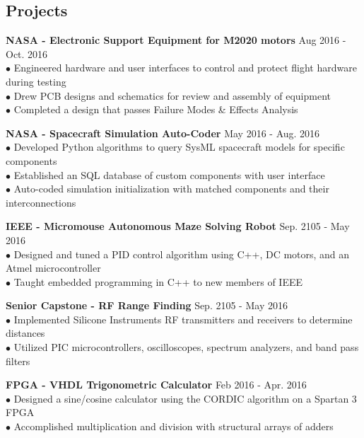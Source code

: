 \documentclass[margin,line]{res}
\begin{document}
\begin{resume}
\section{\sc Projects}
{\bf NASA - Electronic Support Equipment for M2020 motors} \hfill{Aug 2016 - Oct. 2016}\\
$\bullet$ Engineered hardware and user interfaces to control and protect flight hardware during testing \\
$\bullet$ Drew PCB designs and schematics for review and assembly of equipment \\
$\bullet$ Completed a design that passes  Failure Modes \& Effects Analysis

{\bf NASA - Spacecraft Simulation Auto-Coder}
\hfill{May 2016 - Aug. 2016}\\
$\bullet$ Developed Python algorithms to query SysML spacecraft models for specific components \\
$\bullet$ Established an SQL database of custom components with user interface \\
$\bullet$ Auto-coded simulation initialization with matched components and their interconnections 

{\bf IEEE - Micromouse Autonomous Maze Solving Robot}
\hfill{Sep. 2105 - May 2016}\\
$\bullet$ Designed and tuned a PID control algorithm using C++, DC motors, and an Atmel microcontroller \\
$\bullet$ Taught embedded programming in C++ to new members of IEEE


{\bf Senior Capstone - RF Range Finding}
\hfill{Sep. 2105 - May 2016}\\
$\bullet$ Implemented Silicone Instruments RF transmitters and receivers to determine distances \\
$\bullet$ Utilized PIC microcontrollers, oscilloscopes, spectrum analyzers, and band pass filters 


{\bf FPGA - VHDL Trigonometric Calculator }
\hfill{Feb 2016 - Apr. 2016}\\
$\bullet$ Designed a sine/cosine calculator using the CORDIC algorithm on a Spartan 3 FPGA\\
$\bullet$ Accomplished multiplication and division with structural arrays of adders


\end{resume}
\end{document}
